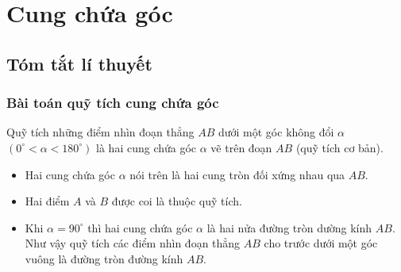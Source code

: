 \section{Cung chứa góc}
\subsection{Tóm tắt lí thuyết}
\subsubsection{Bài toán quỹ tích cung chứa góc}
\begin{dl}
	Quỹ tích những điểm nhìn đoạn thẳng $AB$ dưới một góc không đổi $\alpha$ $(0^\circ<\alpha <180^\circ)$ là hai cung chứa góc $\alpha$ vẽ trên đoạn $AB$ (quỹ tích cơ bản).
\end{dl}
\immini
{\begin{note} \text{}
	\begin{itemize}
		\item Hai cung chứa góc $\alpha$ nói trên là hai cung tròn đối xứng nhau qua $AB$.
		\item Hai điểm $A$ và $B$ được coi là thuộc quỹ tích.
		\item Khi $\alpha =90^\circ$ thì hai cung chứa góc $\alpha$ là hai nửa đường tròn dường kính $AB$. Như vậy quỹ tích các điểm nhìn đoạn thẳng $AB$ cho trước dưới một góc vuông là đường tròn đường kính $AB$.
	\end{itemize}
\end{note}}
{}
